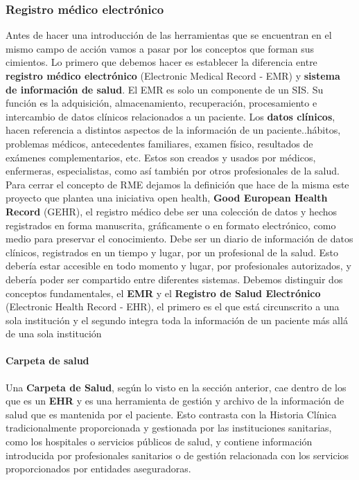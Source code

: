 \subsubsection{Registro médico electrónico}
	Antes de hacer una introducción de las herramientas que se encuentran en el mismo campo de acción vamos a pasar por los conceptos que forman sus cimientos.
Lo primero que debemos hacer es establecer la diferencia entre \textbf{registro médico electrónico} (Electronic Medical Record - EMR) y \textbf{sistema de información de salud}. El EMR es solo un componente de un SIS. Su función es la adquisición, almacenamiento, recuperación, procesamiento e intercambio de datos clínicos relacionados a un paciente. Los \textbf{datos clínicos}, hacen referencia a distintos aspectos de la información de un paciente..hábitos, problemas médicos, antecedentes familiares, examen físico, resultados de exámenes complementarios, etc. Estos son creados y usados por médicos, enfermeras, especialistas, como así también por otros profesionales de la salud. Para cerrar el concepto de RME dejamos la definición que hace de la misma este proyecto que plantea una iniciativa open health, \textbf{Good European Health Record} (GEHR), el registro médico debe ser una colección de datos y hechos registrados en forma manuscrita, gráficamente o en formato electrónico, como medio para preservar el conocimiento. Debe ser un diario de información de datos clínicos, registrados en un tiempo y lugar, por un profesional de la salud. Esto debería estar accesible en todo momento y lugar, por profesionales autorizados, y debería poder ser compartido entre diferentes sistemas. Debemos distinguir dos conceptos fundamentales, el \textbf{EMR} y el \textbf{Registro de Salud Electrónico} (Electronic Health Record - EHR), el primero es el que está circunscrito a una sola institución y el segundo integra toda la información de un paciente más allá de una sola institución

\paragraph{Carpeta de salud}

Una \textbf{Carpeta de Salud}, según lo visto en la sección anterior, cae dentro de los que es un \textbf{EHR} y es una herramienta de gestión y archivo de la información de salud que es mantenida por el paciente.
Esto contrasta con la Historia Clínica tradicionalmente proporcionada y gestionada por las instituciones sanitarias,
como los hospitales o servicios públicos de salud,
y contiene información introducida por profesionales sanitarios o de gestión relacionada con los servicios proporcionados por entidades aseguradoras.

